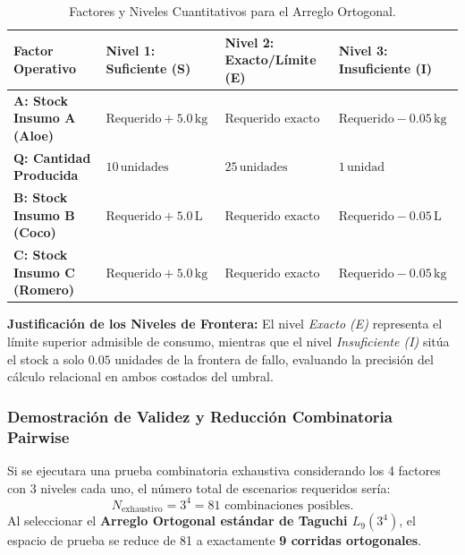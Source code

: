 \documentclass[11pt,a4paper]{article}
\begin{document}
\begin{table}[htbp]
\centering
\small
\begin{tabularx}{\textwidth}{p{3.2cm} X X X}
\toprule
\textbf{Factor Operativo} & \textbf{Nivel 1: Suficiente (S)} & \textbf{Nivel 2: Exacto/Límite (E)} & \textbf{Nivel 3: Insuficiente (I)} \\
\midrule
\textbf{A: Stock Insumo A (Aloe)} & $\text{Requerido} + 5.0\,\text{kg}$ & $\text{Requerido exacto}$ & $\text{Requerido} - 0.05\,\text{kg}$ \\
\textbf{Q: Cantidad Producida} & $10\,\text{unidades}$ & $25\,\text{unidades}$ & $1\,\text{unidad}$ \\
\textbf{B: Stock Insumo B (Coco)} & $\text{Requerido} + 5.0\,\text{L}$ & $\text{Requerido exacto}$ & $\text{Requerido} - 0.05\,\text{L}$ \\
\textbf{C: Stock Insumo C (Romero)} & $\text{Requerido} + 5.0\,\text{kg}$ & $\text{Requerido exacto}$ & $\text{Requerido} - 0.05\,\text{kg}$ \\
\bottomrule
\end{tabularx}
\caption{Factores y Niveles Cuantitativos para el Arreglo Ortogonal.}\label{tab:factores_ao}
\end{table}

\textbf{Justificación de los Niveles de Frontera:} El nivel \textit{Exacto (E)} representa el límite superior admisible de consumo, mientras que el nivel \textit{Insuficiente (I)} sitúa el stock a solo $0.05$ unidades de la frontera de fallo, evaluando la precisión del cálculo relacional en ambos costados del umbral.

\subsubsection{Demostración de Validez y Reducción Combinatoria Pairwise}
Si se ejecutara una prueba combinatoria exhaustiva considerando los 4 factores con 3 niveles cada uno, el número total de escenarios requeridos sería:
\begin{equation*}
    N_{\text{exhaustivo}} = 3^4 = 81 \text{ combinaciones posibles}.
\end{equation*}
Al seleccionar el \textbf{Arreglo Ortogonal estándar de Taguchi $L_9(3^4)$}, el espacio de prueba se reduce de 81 a exactamente \textbf{9 corridas ortogonales}.
\end{document}
